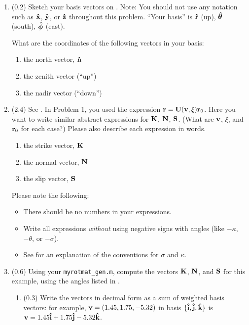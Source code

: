 \documentclass[11pt,titlepage,fleqn]{article}
\newcommand{\rotangB}{\xi}    %
\newcommand{\rotvec}{\bv}      %
\begin{document}
\begin{enumerate}


\item (0.2) Sketch your basis vectors on . Note: You should not use any notation such as $\mbox{\boldmath{$\hat{\rm x}$}}$, $\mbox{\boldmath{$\hat{\rm y}$}}$, or $\mbox{\boldmath{$\hat{\rm z}$}}$ throughout this problem. ``Your basis'' is $\mbox{\boldmath{$\hat{\rm r}$}}$ (up), $\mbox{\boldmath{$\hat{\theta}$}}$ (south), $\mbox{\boldmath{$\hat{\phi}$}}$ (east).

What are the coordinates of the following vectors in your basis:

\begin{enumerate}
\item the north vector, $\mbox{\boldmath{$\hat{\rm n}$}}$

\item the zenith vector (``up'')

\item the nadir vector (``down'')
\end{enumerate}


\item (2.4) See . In Problem 1, you used the expression $\br = \bU(\rotvec,\rotangB)\br_0$. Here you want to write similar abstract expressions for $\mbox{${\bf K}$}$, $\mbox{${\bf N}$}$, $\mbox{${\bf S}$}$. (What are $\rotvec$, $\rotangB$, and $\mbox{${\bf r}$}_0$ for each case?)
Please also describe each expression in words.
%
\begin{enumerate}
\item the strike vector, $\mbox{${\bf K}$}$
\item the normal vector, $\mbox{${\bf N}$}$
\item the slip vector, $\mbox{${\bf S}$}$
\end{enumerate}
%
Please note the following:
%
\begin{itemize}
\item There should be no numbers in your expressions.
\item Write all expressions {\em without} using negative signs with angles (like $-\kappa$, $-\theta$, or $-\sigma$).
\item See  for an explanation of the conventions for $\sigma$ and $\kappa$.
\end{itemize}


\item (0.6) Using your \verb+myrotmat_gen.m+, compute the vectors $\mbox{${\bf K}$}$, $\mbox{${\bf N}$}$, and $\mbox{${\bf S}$}$ for this example, using the angles listed in .
%
\begin{enumerate}
\item (0.3) Write the vectors in decimal form as a sum of weighted basis vectors: for example, $\mbox{${\bf v}$} = (1.45,1.75,-5.32)$ in basis $\{\mbox{\boldmath{$\hat{\rm i}$}},\mbox{\boldmath{$\hat{\rm j}$}},\mbox{\boldmath{$\hat{\rm k}$}}\}$ is $\rotvec = 1.45\bih + 1.75\bjh - 5.32\bkh$.


\end{enumerate}
\end{enumerate}
\end{document}
